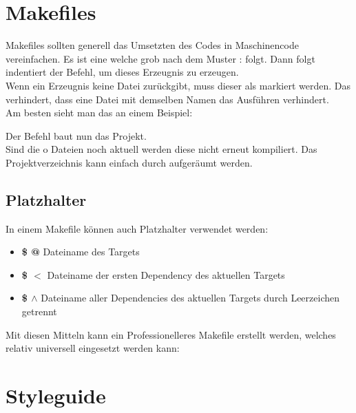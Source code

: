 \section{Makefiles}

Makefiles sollten generell das Umsetzten des Codes in Maschinencode vereinfachen.
Es ist eine  welche grob nach dem Muster  :  folgt. 
Dann folgt indentiert der Befehl, um dieses Erzeugnis zu erzeugen.\\
Wenn ein Erzeugnis keine Datei zurückgibt, muss dieser als  markiert werden. 
Das verhindert, dass eine Datei mit demselben Namen das Ausführen verhindert.\\
Am besten sieht man das an einem Beispiel:



Der Befehl  baut nun das Projekt.\\
Sind die o Dateien noch aktuell werden diese nicht erneut kompiliert. 
Das Projektverzeichnis kann einfach durch  aufgeräumt werden.

\subsection{Platzhalter}

In einem Makefile können auch Platzhalter verwendet werden:

\begin{itemize}[itemsep=1pt, parsep=0pt]
    \item \textbf{\$ @} Dateiname des Targets
    \item \textbf{\$ $<$} Dateiname der ersten Dependency des aktuellen Targets
    \item \textbf{\$ $\wedge$} Dateiname aller Dependencies des aktuellen Targets durch Leerzeichen getrennt
\end{itemize}

Mit diesen Mitteln kann ein Professionelleres Makefile erstellt werden, welches relativ universell eingesetzt werden kann:



\nextcol

\section{Styleguide}

